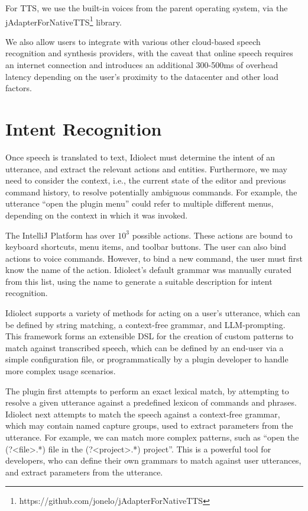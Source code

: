 \documentclass[conference]{IEEEtran}
\begin{document}
For TTS, we use the built-in voices from the parent operating system, via the jAdapterForNativeTTS\footnote{https://github.com/jonelo/jAdapterForNativeTTS} library.

We also allow users to integrate with various other cloud-based speech recognition and synthesis providers, with the caveat that online speech requires an internet connection and introduces an additional 300-500ms of overhead latency depending on the user's proximity to the datacenter and other load factors.

\section{Intent Recognition}

Once speech is translated to text, Idiolect must determine the intent of an utterance, and extract the relevant actions and entities. Furthermore, we may need to consider the context, i.e., the current state of the editor and previous command history, to resolve potentially ambiguous commands. For example, the utterance ``open the plugin menu'' could refer to multiple different menus, depending on the context in which it was invoked.

The IntelliJ Platform has over $10^3$ possible actions. These actions are bound to keyboard shortcuts, menu items, and toolbar buttons. The user can also bind actions to voice commands. However, to bind a new command, the user must first know the name of the action. Idiolect's default grammar was manually curated from this list, using the name to generate a suitable description for intent recognition.

Idiolect supports a variety of methods for acting on a user's utterance, which can be defined by string matching, a context-free grammar, and LLM-prompting. This framework forms an extensible DSL for the creation of custom patterns to match against transcribed speech, which can be defined by an end-user via a simple configuration file, or programmatically by a plugin developer to handle more complex usage scenarios.

The plugin first attempts to perform an exact lexical match, by attempting to resolve a given utterance against a predefined lexicon of commands and phrases. Idiolect next attempts to match the speech against a context-free grammar, which may contain named capture groups, used to extract parameters from the utterance. For example, we can match more complex patterns, such as ``open the (?<file>.*) file in the (?<project>.*) project''. This is a powerful tool for developers, who can define their own grammars to match against user utterances, and extract parameters from the utterance.
\end{document}
